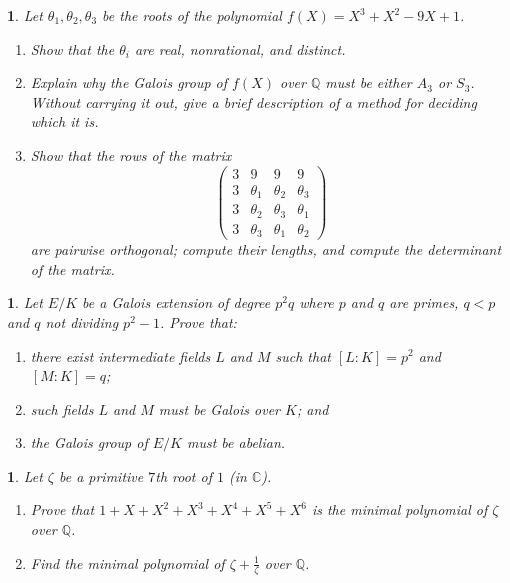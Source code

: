 \documentclass[a4paper,11pt,final,openany]{memoir}
\newtheorem{exercise}[Y]{}
\theoremstyle{nonumberplain}
\begin{document}
\begin{exercise}
\label{x78} Let $\theta_{1},\theta_{2},\theta_{3}$ be the roots of the
polynomial $f(X)=X^{3}+X^{2}-9X+1$.

\begin{enumerate}
\item Show that the $\theta_{i}$ are real, nonrational, and distinct.

\item Explain why the Galois group of $f(X)$ over ${\mathbb{Q}}$ must be
either $A_{3}$ or $S_{3}$. Without carrying it out, give a brief description
of a method for deciding which it is.

\item Show that the rows of the matrix
\[
\left(
\begin{matrix}
3 & 9 & 9 & 9\\
3 & \theta_{1} & \theta_{2} & \theta_{3}\\
3 & \theta_{2} & \theta_{3} & \theta_{1}\\
3 & \theta_{3} & \theta_{1} & \theta_{2}%
\end{matrix}
\right)
\]
are pairwise orthogonal; compute their lengths, and compute the determinant of
the matrix.
\end{enumerate}
\end{exercise}

\begin{exercise}
\label{x79} Let $E/K$ be a Galois extension of degree $p^{2}q $ where $p$ and
$q$ are primes, $q<p$ and $q$ not dividing $p^{2}-1$. Prove that:

\begin{enumerate}
\item there exist intermediate fields $L$ and $M$ such that $[L\colon
K]=p^{2}$ and $[M\colon K]=q$;

\item such fields $L$ and $M$ must be Galois over $K$; and

\item the Galois group of $E/K$ must be abelian.
\end{enumerate}
\end{exercise}

\begin{exercise}
\label{x80} Let $\zeta$ be a primitive $7$th root of $1$ (in $\mathbb{C}$).

\begin{enumerate}
\item Prove that $1+X+X^{2}+X^{3}+X^{4}+X^{5}+X^{6}$ is the minimal polynomial
of $\zeta$ over ${\mathbb{Q}}$.

\item Find the minimal polynomial of $\zeta+\frac1{\zeta}$ over ${\mathbb{Q}}$.
\end{enumerate}
\end{exercise}
\end{document}
